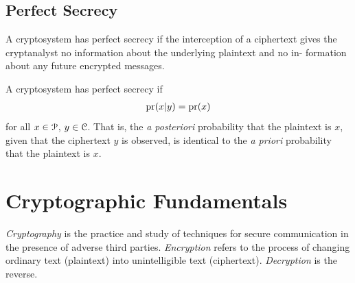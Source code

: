 \documentclass[a4paper, 12pt]{book} %
\begin{document}
\section{Perfect Secrecy}
A cryptosystem has perfect secrecy if the interception of a ciphertext gives
the cryptanalyst no information about the underlying plaintext and no in-
formation about any future encrypted messages.



\begin{definition}
    A cryptosystem has perfect secrecy if 
    \begin{align}
        \operatorname{pr}(x|y) = \operatorname{pr}(x)
    \end{align}
    for all $x \in \EuScript{P}$, $y \in \EuScript{C}$. That is, the \emph{a posteriori} probability that the plaintext is $x$, given that the ciphertext $y$ is observed, is identical to the \emph{a priori} probability that the plaintext is $x$.
\end{definition}








\chapter{Cryptographic  Fundamentals}

\emph{Cryptography} is the practice and study of techniques for secure communication in the presence of adverse third parties. \emph{Encryption} refers to the process of changing ordinary text (plaintext) into unintelligible text (ciphertext). \emph{Decryption} is the reverse.

\end{document}
